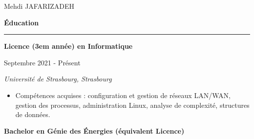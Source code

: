 \documentclass[a4paper]{letter}
\newcommand{\divider}{\rule{\linewidth}{0.9pt}}
\begin{document}
\begin{minipage}[t]{0.67\textwidth}





\setlength{\baselineskip}{1.4\baselineskip}
\vspace{0.7cm}

{\huge Mehdi JAFARIZADEH}

\vspace{0.5cm}


{\large \textbf{Éducation}}
\divider


{\textbf{Licence (3em année) en Informatique}}

{\footnotesize Septembre 2021 - Présent}

{\textit{Université de Strasbourg, Strasbourg}}

\vspace{1mm}

\begin{itemize}
    \footnotesize
            
    \item Compétences acquises : configuration et gestion de réseaux LAN/WAN, 
    gestion des processus, administration Linux, analyse de complexité, structures de données.
\end{itemize}

\vspace{2mm}


{\textbf{Bachelor en Génie des Énergies (équivalent Licence)}}


\end{minipage}
\end{document}
